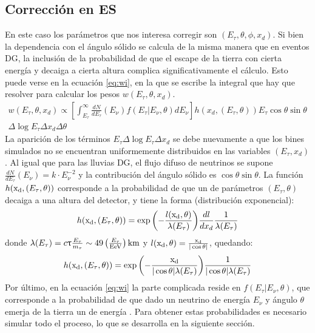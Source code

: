 		\subsection{Corrección en ES}
		\label{sbsc:corrES}
		En este caso los parámetros que nos interesa corregir son $(E_\tau,\theta,\phi,x_d)$.
		Si bien la dependencia con el ángulo sólido se calcula de la misma manera que en eventos DG, la inclusi\'on de la probabilidad de que el \tauon{} escape de la tierra con cierta energía y decaiga a cierta altura complica significativamente el c\'alculo.
		Esto puede verse en la ecuaci\'on \ref{eq:wi}, en la que se escribe la integral que hay que resolver para calcular los pesos $w(E_\tau,\theta,x_d)$.
		\begin{equation}
		\begin{aligned}
		 w(E_\tau,\theta,x_d) \propto  
		 \left[
		 \int_{E_\tau}^\infty \frac{dN}{dE_\tau}(E_\nu) f(E_\tau|E_\nu,\theta) dE_\nu
		 \right]
		 h(x_d,(E_\tau,\theta)) E_\tau 
		 \cos\theta \sin\theta&\\
		 \Delta\log E_\tau \Delta x_d \Delta\theta&
		 \end{aligned}
		 \label{eq:wi}
		\end{equation}
		La aparición de los términos $E_\tau \Delta\log E_\tau \Delta x_d$ se debe nuevamente a que los bines simulados no se encuentran uniformemente distribuidos en las variables $(E_\tau,x_d)$.
		Al igual que para las lluvias DG, el flujo difuso de neutrinos se supone $\frac{dN}{dE_\tau}(E_\nu)=k\cdot E_\nu^{-2}$ y la contribuci\'on del \'angulo s\'olido es $\cos\theta \sin\theta$.
		La función $h({\rm x_d},(E_\tau,\theta))$ corresponde a la probabilidad de que un \tauon{} de parámetros $(E_\tau,\theta)$ decaiga a una altura \xd{} del detector, y tiene la forma (distribuci\'on exponencial):
		\begin{equation}
		 h({\rm x_d},(E_\tau,\theta))=
		 \exp{\left(
		 -\frac{l({\rm x_d},\theta)}{\lambda(E_\tau)}
		 \right)}
		 \frac{dl}{dx_d}\frac{1}{\lambda(E_\tau)}
		\end{equation}
		donde $\lambda(E_\tau)=c\uptau\frac{E_\tau}{m_\tau}\sim49\left(\frac{E_\tau}{\rm EeV}\right){\rm km}$ y $l({\rm x_d},\theta)=\frac{{\rm x_d}}{|\cos\theta|}$, quedando:
		\begin{equation}
		 h({\rm x_d},(E_\tau,\theta))=
		 \exp{\left(
		 -\frac{{\rm x_d}}{|\cos\theta|\lambda(E_\tau)}
		 \right)}
		 \frac{1}{|\cos\theta|\lambda(E_\tau)}
		 \label{eq:ptaudecay}
		\end{equation}
		Por \'ultimo, en la ecuación \ref{eq:wi} la parte complicada reside en $f(E_\tau|E_\nu,\theta)$, que corresponde a la probabilidad de que dado un neutrino de energía $E_\nu$ y ángulo $\theta$ emerja de la tierra un \tauon{} de energía \etau{}.
		Para obtener estas probabilidades es necesario simular todo el proceso, lo que se desarrolla en la siguiente secci\'on.
		
